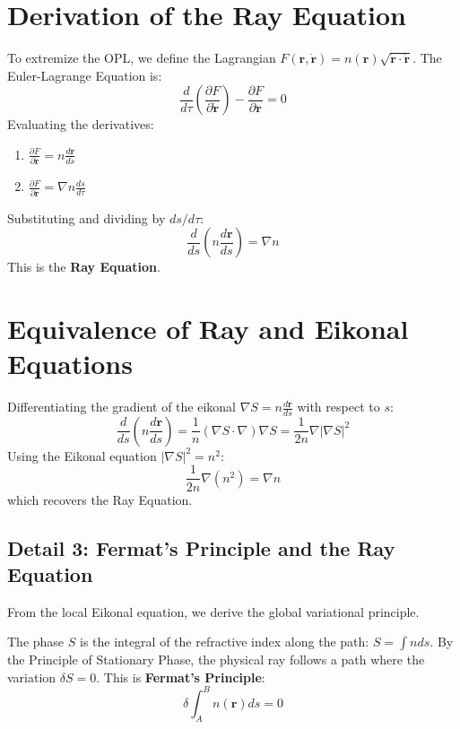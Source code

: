 \documentclass[12pt,a4paper]{article}
\begin{document}
\section{Derivation of the Ray Equation}
To extremize the OPL, we define the Lagrangian $F(\mathbf{r}, \dot{\mathbf{r}}) = n(\mathbf{r}) \sqrt{\dot{\mathbf{r}} \cdot \dot{\mathbf{r}}}$. The Euler-Lagrange Equation is:
\begin{equation}
\frac{d}{d\tau} \left( \frac{\partial F}{\partial \dot{\mathbf{r}}} \right) - \frac{\partial F}{\partial \mathbf{r}} = 0
\end{equation}
Evaluating the derivatives:
\begin{enumerate}
    \item $\frac{\partial F}{\partial \dot{\mathbf{r}}} = n \frac{d\mathbf{r}}{ds}$
    \item $\frac{\partial F}{\partial \mathbf{r}} = \nabla n \frac{ds}{d\tau}$
\end{enumerate}
Substituting and dividing by $ds/d\tau$:
\begin{equation}
\frac{d}{ds} \left( n \frac{d\mathbf{r}}{ds} \right) = \nabla n
\end{equation}
This is the \textbf{Ray Equation}.

\section{Equivalence of Ray and Eikonal Equations}
Differentiating the gradient of the eikonal $\nabla S = n \frac{d\mathbf{r}}{ds}$ with respect to $s$:
\begin{equation}
\frac{d}{ds} (n \frac{d\mathbf{r}}{ds}) = \frac{1}{n} (\nabla S \cdot \nabla) \nabla S = \frac{1}{2n} \nabla |\nabla S|^2
\end{equation}
Using the Eikonal equation $|\nabla S|^2 = n^2$:
\begin{equation}
\frac{1}{2n} \nabla (n^2) = \nabla n
\end{equation}
which recovers the Ray Equation.

\subsection{Detail 3: Fermat's Principle and the Ray Equation}
From the local Eikonal equation, we derive the global variational principle.

The phase $S$ is the integral of the refractive index along the path: $S = \int n ds$. By the Principle of Stationary Phase, the physical ray follows a path where the variation $\delta S = 0$. This is \textbf{Fermat's Principle}:
$$\delta \int_{A}^{B} n(\mathbf{r}) ds = 0$$
\end{document}
